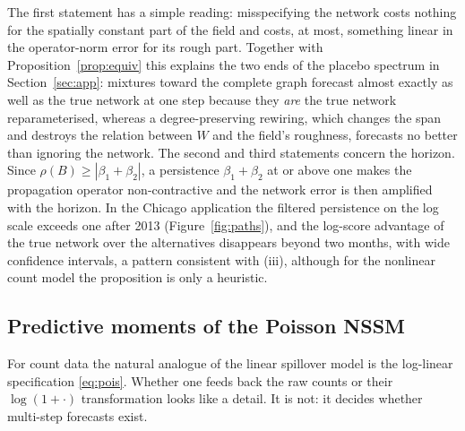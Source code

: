 \documentclass[12pt]{article}
\theoremstyle{plain}
\theoremstyle{definition}
\theoremstyle{remark}
\begin{document}
The first statement has a simple reading: misspecifying the network costs nothing for the spatially constant part of the field and costs, at most, something linear in the operator-norm error for its rough part. Together with Proposition~\ref{prop:equiv} this explains the two ends of the placebo spectrum in Section~\ref{sec:app}: mixtures toward the complete graph forecast almost exactly as well as the true network at one step because they \emph{are} the true network reparameterised, whereas a degree-preserving rewiring, which changes the span and destroys the relation between $W$ and the field's roughness, forecasts no better than ignoring the network. The second and third statements concern the horizon. Since $\rho(B)\ge|\beta_1+\beta_2|$, a persistence $\beta_1+\beta_2$ at or above one makes the propagation operator non-contractive and the network error is then amplified with the horizon. In the Chicago application the filtered persistence on the log scale exceeds one after 2013 (Figure~\ref{fig:paths}), and the log-score advantage of the true network over the alternatives disappears beyond two months, with wide confidence intervals, a pattern consistent with (iii), although for the nonlinear count model the proposition is only a heuristic.

\subsection{Predictive moments of the Poisson NSSM}\label{sec:poisson}

For count data the natural analogue of the linear spillover model is the log-linear specification \eqref{eq:pois}. Whether one feeds back the raw counts or their $\log(1+\cdot)$ transformation looks like a detail. It is not: it decides whether multi-step forecasts exist.
\end{document}
